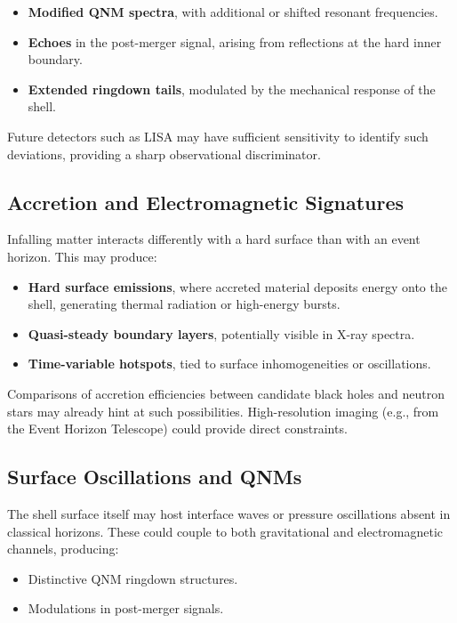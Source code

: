 \documentclass[12pt]{article}
\begin{document}
\begin{itemize}
    \item \textbf{Modified QNM spectra}, with additional or shifted resonant frequencies.
    \item \textbf{Echoes} in the post-merger signal, arising from reflections at the hard inner boundary.
    \item \textbf{Extended ringdown tails}, modulated by the mechanical response of the shell.
\end{itemize}

Future detectors such as LISA may have sufficient sensitivity to identify such deviations, providing a sharp observational discriminator.

\subsection{Accretion and Electromagnetic Signatures}

Infalling matter interacts differently with a hard surface than with an event horizon. This may produce:

\begin{itemize}
    \item \textbf{Hard surface emissions}, where accreted material deposits energy onto the shell, generating thermal radiation or high-energy bursts.
    \item \textbf{Quasi-steady boundary layers}, potentially visible in X-ray spectra.
    \item \textbf{Time-variable hotspots}, tied to surface inhomogeneities or oscillations.
\end{itemize}

Comparisons of accretion efficiencies between candidate black holes and neutron stars may already hint at such possibilities. High-resolution imaging (e.g., from the Event Horizon Telescope) could provide direct constraints.

\subsection{Surface Oscillations and QNMs}

The shell surface itself may host interface waves or pressure oscillations absent in classical horizons. These could couple to both gravitational and electromagnetic channels, producing:

\begin{itemize}
    \item Distinctive QNM ringdown structures.
    \item Modulations in post-merger signals.
\end{itemize}
\end{document}
